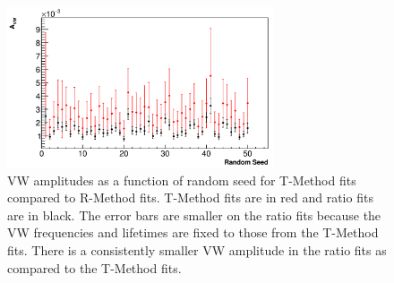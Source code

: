 \documentclass[12pt,letterpaper]{article}
\begin{document}
\begin{figure}[]
    \centering
    \includegraphics[width=0.7\textwidth]{vw-fixed-w-tau-9d-randseeds}
    \caption[]{VW amplitudes as a function of random seed for T-Method fits compared to R-Method fits. T-Method fits are in red and ratio fits are in black. The error bars are smaller on the ratio fits because the VW frequencies and lifetimes are fixed to those from the T-Method fits. There is a consistently smaller VW amplitude in the ratio fits as compared to the T-Method fits.}
    \label{fig:vw-fixed-w-tau-9d-randseeds}
\end{figure}
\end{document}
